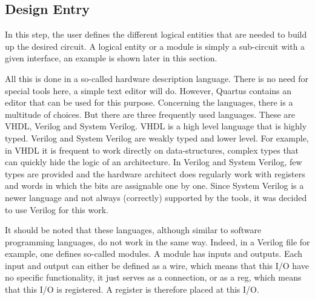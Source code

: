 \subsection{Design Entry}

In this step, the user defines the different logical entities that are needed to build up the 
desired circuit. A logical entity or a module is simply a sub-circuit with a given interface, an
example is shown later in this section.

All this is done in a so-called hardware description language. There is no need for special tools 
here, a simple text editor will do. However, Quartus contains an editor that can be used for this 
purpose. Concerning the languages, there is a multitude of choices. But there are three frequently used 
languages. These are VHDL, Verilog and System Verilog. VHDL is a high level language that is highly typed.
Verilog and System Verilog are weakly typed and lower level. For example, in VHDL it is 
frequent to work directly on data-structures, complex types that can quickly hide the logic of an 
architecture. In Verilog and System Verilog, few types are provided and the hardware architect does 
regularly work with registers and words in which the bits are assignable one by one. Since System 
Verilog is a newer language and not always (correctly) supported by the tools, it was decided to use 
Verilog for this work. 

It should be noted that these languages, although similar to software programming languages, do not 
work in the same way. Indeed, in a Verilog file for example, one defines so-called modules. 
A module has inputs and outputs. Each input and output can either be defined as a wire, 
which means that this I/O have no specific functionality, it just serves as a connection, or 
as a reg, which means that this I/O is registered. A register is therefore placed at this I/O. 

